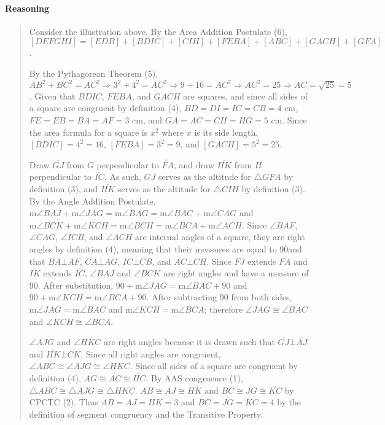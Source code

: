 \documentclass[letterpaper,12pt,twoside]{report}
\begin{document}
	\paragraph{Reasoning}
	\begin{quotation}
		
		Consider the illustration above. By the Area Addition Postulate (6), $[DEFGHI]=[EDB]+[BDIC]+[CIH]+[FEBA]+[ABC]+[GACH]+[GFA]$.
		
		By the Pythagorean Theorem (5), $AB^2+BC^2=AC^2 \Rightarrow 3^2+4^2=AC^2 \Rightarrow 9+16=AC^2 \Rightarrow AC^2=25 \Rightarrow AC=\sqrt{25}=5$. Given that $BDIC$, $FEBA$, and $GACH$ are squares, and since all sides of a square are congruent by definition (4), $BD=DI=IC=CB=4$ cm, $FE=EB=BA=AF=3$ cm, and $GA=AC=CH=HG=5$ cm. Since the area formula for a square is $x^2$ where $x$ is its side length, $[BDIC]=4^2=16$, $[FEBA]=3^2=9$, and $[GACH]=5^2=25$.
		
		Draw $\overline{GJ}$ from $G$ perpendicular to $\overleftrightarrow{FA}$, and draw $\overline{HK}$ from $H$ perpendicular to $\overleftrightarrow{IC}$. As such, $\overline{GJ}$ serves as the altitude for $\triangle GFA$ by definition (3), and $\overline{HK}$ serves as the altitude for $\triangle CIH$ by definition (3). By the Angle Addition Postulate, $\text{m}\angle BAJ+\text{m}\angle JAG=\text{m}\angle BAG=\text{m}\angle BAC+\text{m}\angle CAG$ and $\text{m}\angle BCK+\text{m}\angle KCH=\text{m}\angle BCH=\text{m}\angle BCA+\text{m}\angle ACH$. Since $\angle BAF$, $\angle CAG$, $\angle ICB$, and $\angle ACH$ are internal angles of a square, they are right angles by definition (4), meaning that their measures are equal to 90\textdegree \space and that $\overline{BA}\bot\overline{AF}$, $\overline{CA}\bot\overline{AG}$, $\overline{IC}\bot\overline{CB}$, and $\overline{AC}\bot\overline{CH}$. Since $\overline{FJ}$ extends $\overline{FA}$ and $\overline{IK}$ extends $\overline{IC}$, $\angle BAJ$ and $\angle BCK$ are right angles and have a measure of 90\textdegree. After substitution, $90+\text{m}\angle JAG=\text{m}\angle BAC+90$ and $90+\text{m}\angle KCH=\text{m}\angle BCA+90$. After subtracting 90 from both sides, $\text{m}\angle JAG=\text{m}\angle BAC$ and $\text{m}\angle KCH=\text{m}\angle BCA$; therefore $\angle JAG \cong \angle BAC$ and $\angle KCH \cong \angle BCA$.
		
		$\angle AJG$ and $\angle HKC$ are right angles because it is drawn such that $\overline{GJ}\bot\overline{AJ}$ and $\overline{HK}\bot\overline{CK}$. Since all right angles are congruent, $\angle ABC \cong \angle AJG \cong \angle HKC$. Since all sides of a square are congruent by definition (4), $\overline{AG}\cong\overline{AC}\cong\overline{HC}$. By AAS congruence (1), $\triangle ABC\cong\triangle AJG\cong\triangle HKC$. $\overline{AB}\cong\overline{AJ}\cong\overline{HK}$ and $\overline{BC}\cong\overline{JG}\cong\overline{KC}$ by CPCTC (2). Thus $AB=AJ=HK=3$ and $BC=JG=KC=4$ by the definition of segment congruency and the Transitive Property.
		

\end{quotation}
\end{document}
